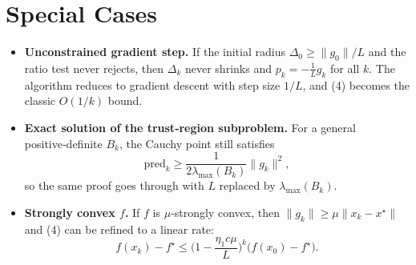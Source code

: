 \documentclass{article}
\begin{document}
\section*{Special Cases}
\begin{itemize}
\item \textbf{Unconstrained gradient step.} If the initial radius $\Delta_0\ge \|g_0\|/L$ and the ratio test never rejects, then $\Delta_k$ never shrinks and $p_k=-\frac{1}{L}g_k$ for all $k$. The algorithm reduces to gradient descent with step size $1/L$, and (4) becomes the classic $O(1/k)$ bound.
\item \textbf{Exact solution of the trust‑region subproblem.} For a general positive‑definite $B_k$, the Cauchy point still satisfies
\[
\text{pred}_k\ge \frac{1}{2\lambda_{\max}(B_k)}\|g_k\|^2,
\]
so the same proof goes through with $L$ replaced by $\lambda_{\max}(B_k)$.
\item \textbf{Strongly convex $f$.} If $f$ is $\mu$‑strongly convex, then $\|g_k\|\ge \mu\|x_k-x^\star\|$ and (4) can be refined to a linear rate:
\[
f(x_k)-f^\star\le \Big(1-\frac{\eta_1c\mu}{L}\Big)^k\bigl(f(x_0)-f^\star\bigr).
\]
\end{itemize}
\end{document}
